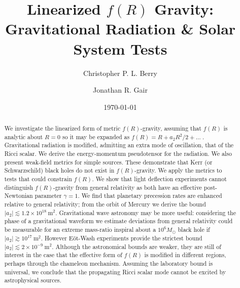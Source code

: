 \documentclass[aps,prd,amsfonts,amssymb,amsmath,nofootinbib,reprint,showpacs]{revtex4-1}
\newcommand{\units}[1]{\ensuremath{~\mathrm{#1}}}
\begin{document}

\title{Linearized $f(R)$ Gravity: Gravitational Radiation \& Solar System Tests}

\author{Christopher P. L. Berry}
\author{Jonathan R. Gair}

\date{\today}

\begin{abstract}
We investigate the linearized form of metric $f(R)$-gravity, assuming that $f(R)$ is analytic about $R = 0$ so it may be expanded as $f(R) = R + a_2R^2/2 + \ldots\;$. Gravitational radiation is modified, admitting an extra mode of oscillation, that of the Ricci scalar. We derive the energy-momentum pseudotensor for the radiation. We also present weak-field metrics for simple sources. These demonstrate that Kerr (or Schwarzschild) black holes do not exist in $f(R)$-gravity. We apply the metrics to tests that could constrain $f(R)$. We show that light deflection experiments cannot distinguish $f(R)$-gravity from general relativity as both have an effective post-Newtonian parameter $\gamma = 1$. We find that planetary precession rates are enhanced relative to general relativity; from the orbit of Mercury we derive the bound $|a_2| \lesssim 1.2 \times 10^{18}\units{m^2}$. Gravitational wave astronomy may be more useful: considering the phase of a gravitational waveform we estimate deviations from general relativity could be measurable for an extreme mass-ratio inspiral about a $10^6 M_\odot$ black hole if $|a_2| \gtrsim 10^{17}\units{m^2}$. However E\"ot-Wash experiments provide the strictest bound $|a_2| \lesssim 2 \times 10^{-9}\units{m^2}$. Although the astronomical bounds are weaker, they are still of interest in the case that the effective form of $f(R)$ is modified in different regions, perhaps through the chameleon mechanism. Assuming the laboratory bound is universal, we conclude that the propagating Ricci scalar mode cannot be excited by astrophysical sources.
\end{abstract}


\maketitle
\end{document}

